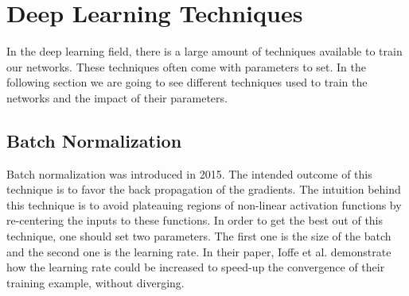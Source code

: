 \chapter{Deep Learning Techniques} %
\label{sec:deep_learning_techniques}



In the deep learning field, there is a large amount of techniques available to train our networks. These techniques often come with parameters to set. In the following section we are going to see different techniques used to train the networks and the impact of their parameters.

\section{Batch Normalization} %
\label{sec:batch_normalization}
	
	Batch normalization \cite{ioffe2015batch} was introduced in 2015. 
	The intended outcome of this technique is to favor the back propagation of the gradients. 
	The intuition behind this technique is to avoid plateauing regions of non-linear activation functions by re-centering the inputs to these functions. 
	In order to get the best out of this technique, one should set two parameters. The first one is the size of the batch and the second one is the learning rate. In their paper, Ioffe et al. demonstrate how the learning rate could be increased to speed-up the convergence of their training example, without diverging.